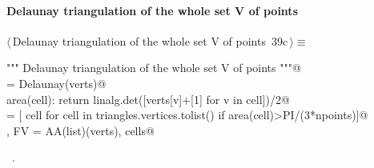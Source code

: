 \documentclass[11pt,oneside]{article}	%
\begin{document}
\paragraph{Delaunay triangulation of the whole set V of points}
\begin{flushleft} \small \label{scrap62}
\protect{}$\langle\,$Delaunay triangulation of the whole set V of points\nobreak\ {\footnotesize 39c}$\,\rangle\equiv$
\vspace{-1ex}
\begin{list}{}{} \item
\mbox{}\verb@""" Delaunay triangulation of the whole set V of points """@\\
\mbox{}\verb@triangles = Delaunay(verts)@\\
\mbox{}\verb@def area(cell): return linalg.det([verts[v]+[1] for v in cell])/2@\\
\mbox{}\verb@cells = [ cell for cell in triangles.vertices.tolist() if area(cell)>PI/(3*npoints)]@\\
\mbox{}\verb@V, FV = AA(list)(verts), cells@\\
\mbox{}\verb@@{\NWsep}
\end{list}
\vspace{-1ex}
\footnotesize\addtolength{\baselineskip}{-1ex}
\begin{list}{}{\setlength{\itemsep}{-\parsep}\setlength{\itemindent}{-\leftmargin}}
\item \NWtxtMacroRefIn\ .
\end{list}
\end{flushleft}
\end{document}
